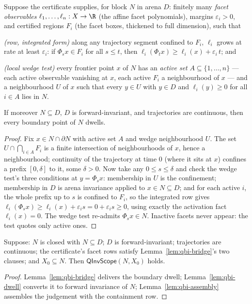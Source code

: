 \begin{blemma}\label{lem:qbi-bridge}
Suppose the certificate supplies, for block $N$ in arena $D$: finitely
many \emph{facet observables} $\ell_1, \dots, \ell_n : X \to \R$ (the
affine facet polynomials), margins $\varepsilon_i > 0$, and certified
regions $F_i$ (the facet boxes, thickened to full dimension), such that

\emph{(row, integrated form)} along any trajectory segment confined to
$F_i$, $\ell_i$ grows at rate at least $\varepsilon_i$:
if $\Phi_s x \in F_i$ for all $s \leq t$, then
$\ell_i(\Phi_t x) \geq \ell_i(x) + \varepsilon_i\, t$; and

\emph{(local wedge test)} every frontier point $x$ of $N$ has an
\emph{active set} $A \subseteq \{1, \dots, n\}$ --- each active
observable vanishing at $x$, each active $F_i$ a neighbourhood of $x$
--- and a neighbourhood $U$ of $x$ such that every $y \in U$ with
$y \in D$ and $\ell_i(y) \geq 0$ for all $i \in A$ lies in $N$.

If moreover $N \subseteq D$, $D$ is forward-invariant, and trajectories
are continuous, then every boundary point of $N$ dwells.
\end{blemma}
\begin{proof}
Fix $x \in N \cap \partial N$ with active set $A$ and wedge
neighbourhood $U$. The set $U \cap \bigcap_{i \in A} F_i$ is a finite
intersection of neighbourhoods of $x$, hence a neighbourhood; continuity
of the trajectory at time $0$ (where it sits at $x$) confines a prefix
$[0, \delta]$ to it, some $\delta > 0$. Now take any
$0 \leq s \leq \delta$
and check the wedge test's three conditions at $y = \Phi_s x$:
membership in $U$ is the confinement; membership in $D$ is arena
invariance applied to $x \in N \subseteq D$; and for each active $i$,
the whole prefix up to $s$ is confined to $F_i$, so the integrated row
gives $\ell_i(\Phi_s x) \geq \ell_i(x) + \varepsilon_i s
= 0 + \varepsilon_i s \geq 0$, using exactly the activation fact
$\ell_i(x) = 0$. The wedge test re-admits $\Phi_s x \in N$. Inactive
facets never appear: the test quotes only active ones.
\end{proof}

\begin{bthm}\label{thm:qbi-sound}
Suppose: $N$ is closed with $N \subseteq D$; $D$ is forward-invariant;
trajectories are continuous; the certificate's facet rows satisfy
Lemma~\ref{lem:qbi-bridge}'s two clauses; and $X_0 \subseteq N$. Then
$\mathsf{QInvScope}(N, X_0)$ holds.
\end{bthm}
\begin{proof}
Lemma~\ref{lem:qbi-bridge} delivers the boundary dwell;
Lemma~\ref{lem:qbi-dwell} converts it to forward invariance of $N$;
Lemma~\ref{lem:qbi-assembly} assembles the judgement with the
containment row.
\end{proof}

